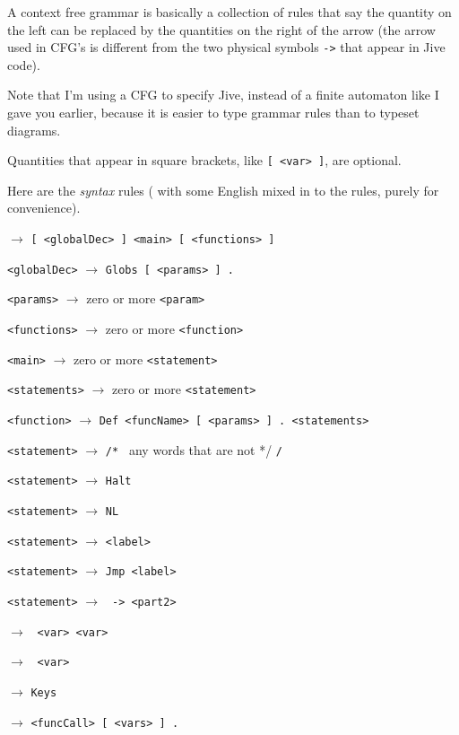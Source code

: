 A context free grammar is basically a collection of rules that say the quantity on the left can be
replaced by the quantities on the right of the arrow (the arrow used in CFG's is 
different from the two physical symbols {\tt ->} that appear in Jive code).
\medskip

Note that I'm using a CFG to specify Jive, instead of a finite automaton like I gave you earlier,
 because it is easier to type grammar rules than to typeset diagrams.
 \medskip
 
 Quantities that appear in square brackets, like {\tt [ <var> ]}, are optional.
 \medskip
 
Here are the {\it syntax\/} rules ( with some English mixed in to the rules, purely
for convenience). 
\medskip

{ \baselineskip

{\tt <Jive program>} $\rightarrow$ {\tt [ <globalDec> ]  <main> [ <functions> ] }

{\tt <globalDec>} $\rightarrow$ {\tt Globs [ <params> ] .} 

{\tt <params>} $\rightarrow$ zero or more {\tt <param>}

{\tt <functions>} $\rightarrow$  zero or more {\tt <function>} 

{\tt <main>} $\rightarrow$ zero or more {\tt <statement>}

{\tt <statements>} $\rightarrow$ zero or more {\tt <statement>}

{\tt <function>} $\rightarrow$ {\tt Def <funcName> [ <params> ] .  <statements>} 
\bigskip

{\tt <statement>} $\rightarrow$ {\tt /* } any words that are not */ {\tt */} 

{\tt <statement>} $\rightarrow$ {\tt Halt} 

{\tt <statement>} $\rightarrow$ {\tt NL}  

{\tt <statement>} $\rightarrow$ {\tt <label>}

{\tt <statement>} $\rightarrow$ {\tt Jmp <label>}

{\tt <statement>} $\rightarrow$ {\tt <part1> -> <part2>}
\medskip

\vfil\eject

{\tt <part1>} $\rightarrow$ {\tt <bif2> <var> <var>} 

{\tt <part1>} $\rightarrow$ {\tt <bif1> <var>}

{\tt <part1>} $\rightarrow$ {\tt Keys}

{\tt <part1>} $\rightarrow$ {\tt <funcCall> [ <vars> ] .}

}
